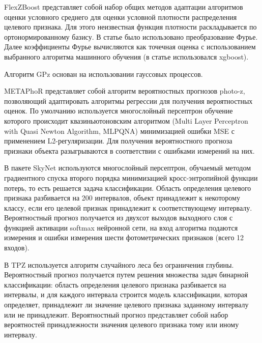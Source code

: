 FlexZBoost \cite{bib:flexzboost} представляет собой набор общих методов адаптации алгоритмов оценки условного среднего для оценки условной плотности распределения целевого признака. Для этого неизвестная функция плотности раскладывается по ортонормированному базису. В статье было использовано преобразование Фурье. Далее коэффициенты Фурье вычисляются как точечная оценка с использованием выбранного алгоритма машинного обучения (в статье использовался xgboost).

Алгоритм GPz \cite{bib:gpz} основан на использовании гауссовых процессов. 

METAPhoR \cite{bib:metaphor} представляет собой алгоритм вероятностных прогнозов photo-z, позволяющий адаптировать алгоритмы регрессии для получения вероятностных оценок. По умолчанию используется многослойный персептрон обучение которого происходит квазиньютоновским алгоритмом (Multi Layer Perceptron with Quasi Newton Algorithm, MLPQNA) минимизацией ошибки MSE с применением L2-регуляризации. Для получения вероятностного прогноза признаки объекта разыгрываются в соответствии с ошибками измерений на них.

В пакете SkyNet \cite{bib:skynet} используются многослойный персептрон, обучаемый методом градиентного спуска второго порядка минимизацией кросс-энтропийной функции потерь, то есть решается задача классификации. Область определения целевого признака разбивается на 200 интервалов, объект принадлежит к некоторому классу, если его целевой признак принадлежит к соответствующему интервалу. Вероятностный прогноз получается из двухсот выходов выходного слоя с функцией активации softmax нейронной сети, на вход алгоритма подаются измерения и ошибки измерения шести фотометрических признаков (всего 12 входов).

В TPZ \cite{bib:tpz} используется алгоритм случайного леса без ограничения глубины. Вероятностный прогноз получается путем решения множества задач бинарной классификации: область определения целевого признака разбивается на интервалы, и для каждого интервала строится модель классификации, которая определяет, принадлежит ли значение целевого признака заданному интервалу или не принадлежит. Вероятностный прогноз представляет собой набор вероятностей принадлежности значения целевого признака тому или иному интервалу.


